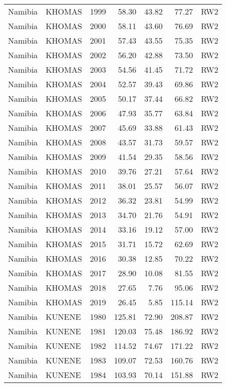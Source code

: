 \begin{longtable}{lllrrrl}
  Namibia & KHOMAS & 1999 & 58.30 & 43.82 & 77.27 & RW2 \\ 
  Namibia & KHOMAS & 2000 & 58.11 & 43.60 & 76.69 & RW2 \\ 
  Namibia & KHOMAS & 2001 & 57.43 & 43.55 & 75.35 & RW2 \\ 
  Namibia & KHOMAS & 2002 & 56.20 & 42.88 & 73.50 & RW2 \\ 
  Namibia & KHOMAS & 2003 & 54.56 & 41.45 & 71.72 & RW2 \\ 
  Namibia & KHOMAS & 2004 & 52.57 & 39.43 & 69.86 & RW2 \\ 
  Namibia & KHOMAS & 2005 & 50.17 & 37.44 & 66.82 & RW2 \\ 
  Namibia & KHOMAS & 2006 & 47.93 & 35.77 & 63.84 & RW2 \\ 
  Namibia & KHOMAS & 2007 & 45.69 & 33.88 & 61.43 & RW2 \\ 
  Namibia & KHOMAS & 2008 & 43.57 & 31.73 & 59.57 & RW2 \\ 
  Namibia & KHOMAS & 2009 & 41.54 & 29.35 & 58.56 & RW2 \\ 
  Namibia & KHOMAS & 2010 & 39.76 & 27.21 & 57.64 & RW2 \\ 
  Namibia & KHOMAS & 2011 & 38.01 & 25.57 & 56.07 & RW2 \\ 
  Namibia & KHOMAS & 2012 & 36.32 & 23.81 & 54.99 & RW2 \\ 
  Namibia & KHOMAS & 2013 & 34.70 & 21.76 & 54.91 & RW2 \\ 
  Namibia & KHOMAS & 2014 & 33.16 & 19.12 & 57.00 & RW2 \\ 
  Namibia & KHOMAS & 2015 & 31.71 & 15.72 & 62.69 & RW2 \\ 
  Namibia & KHOMAS & 2016 & 30.38 & 12.85 & 70.22 & RW2 \\ 
  Namibia & KHOMAS & 2017 & 28.90 & 10.08 & 81.55 & RW2 \\ 
  Namibia & KHOMAS & 2018 & 27.65 & 7.76 & 95.06 & RW2 \\ 
  Namibia & KHOMAS & 2019 & 26.45 & 5.85 & 115.14 & RW2 \\ 
  Namibia & KUNENE & 1980 & 125.81 & 72.90 & 208.87 & RW2 \\ 
  Namibia & KUNENE & 1981 & 120.03 & 75.48 & 186.92 & RW2 \\ 
  Namibia & KUNENE & 1982 & 114.52 & 74.67 & 171.22 & RW2 \\ 
  Namibia & KUNENE & 1983 & 109.07 & 72.53 & 160.76 & RW2 \\ 
  Namibia & KUNENE & 1984 & 103.93 & 70.14 & 151.88 & RW2 \\ 

\end{longtable}
